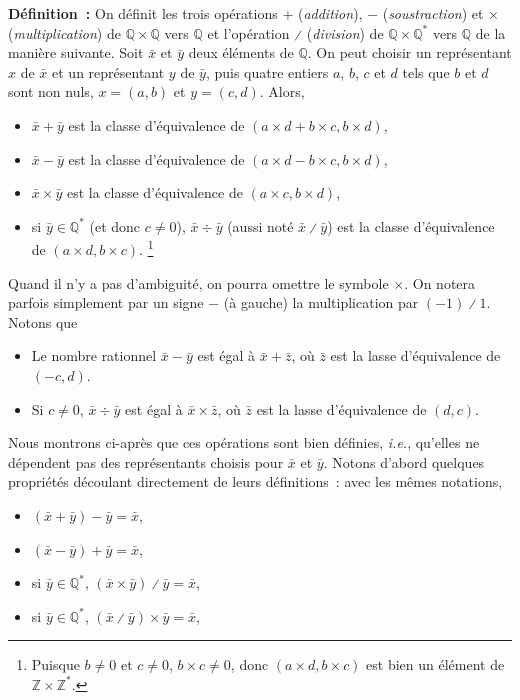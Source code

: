 \noindent\textbf{Définition :} On définit les trois opérations $+$ (\emph{addition}), $-$ (\emph{soustraction}) et $\times$ (\emph{multiplication}) de $\mathbb{Q} \times \mathbb{Q}$ vers $\mathbb{Q}$ et l'opération $\divslash$ (\emph{division}) de $\mathbb{Q} \times \mathbb{Q}^*$ vers $\mathbb{Q}$ de la manière suivante.  
Soit $\bar{x}$ et $\bar{y}$ deux éléments de $\mathbb{Q}$. 
On peut choisir un représentant $x$ de $\bar{x}$ et un représentant $y$ de $\bar{y}$, puis quatre entiers $a$, $b$, $c$ et $d$ tels que $b$ et $d$ sont non nuls, $x = (a, b)$ et $y = (c, d)$.
Alors, 
\begin{itemize}[nosep]
    \item \sindex[isy]{$+$} $\bar{x} + \bar{y}$ est la classe d'équivalence de $(a \times d + b \times c, b \times d)$,
    \item \sindex[isy]{$-$} $\bar{x} - \bar{y}$ est la classe d'équivalence de $(a \times d - b \times c, b \times d)$,
    \item \sindex[isy]{$\times$} $\bar{x} \times \bar{y}$ est la classe d'équivalence de $(a \times c, b \times d)$,
    \item \sindex[isy]{$\div$}\sindex[isy]{$\divslash$} si $\bar{y} \in \mathbb{Q}^*$ (et donc $c \neq 0$), $\bar{x} \div \bar{y}$ (aussi noté $\bar{x} \divslash \bar{y}$) est la classe d'équivalence de $(a \times d, b \times c)$.%
        \footnote{Puisque $b \neq 0$ et $c \neq 0$, $b \times c \neq 0$, donc $(a \times d, b \times c)$ est bien un élément de $\mathbb{Z} \times \mathbb{Z}^*$.}
\end{itemize}
Quand il n'y a pas d'ambiguité, on pourra omettre le symbole $\times$. 
On notera parfois simplement par un signe $-$ (à gauche) la multiplication par $(-1) \divslash 1$.
Notons que 
\begin{itemize}[nosep]
    \item Le nombre rationnel $\bar{x} - \bar{y}$ est égal à $\bar{x} + \bar{z}$, où $\bar{z}$ est la lasse d'équivalence de $(-c, d)$.
    \item Si $c \neq 0$, $\bar{x} \div \bar{y}$ est égal à $\bar{x} \times \bar{z}$, où $\bar{z}$ est la lasse d'équivalence de $(d, c)$.
\end{itemize}

\medskip

Nous montrons ci-après que ces opérations sont bien définies, \emph{i.e.}, qu'elles ne dépendent pas des représentants choisis pour $\bar{x}$ et $\bar{y}$.
Notons d'abord quelques propriétés découlant directement de leurs définitions : avec les mêmes notations, 
\begin{itemize}[nosep]
    \item $(\bar{x} + \bar{y}) - \bar{y} = \bar{x}$,
    \item $(\bar{x} - \bar{y}) + \bar{y} = \bar{x}$,
    \item si $\bar{y} \in \mathbb{Q}^*$, $(\bar{x} \times \bar{y}) \divslash \bar{y} = \bar{x}$,
    \item si $\bar{y} \in \mathbb{Q}^*$, $(\bar{x} \divslash \bar{y}) \times \bar{y} = \bar{x}$,
\end{itemize}

